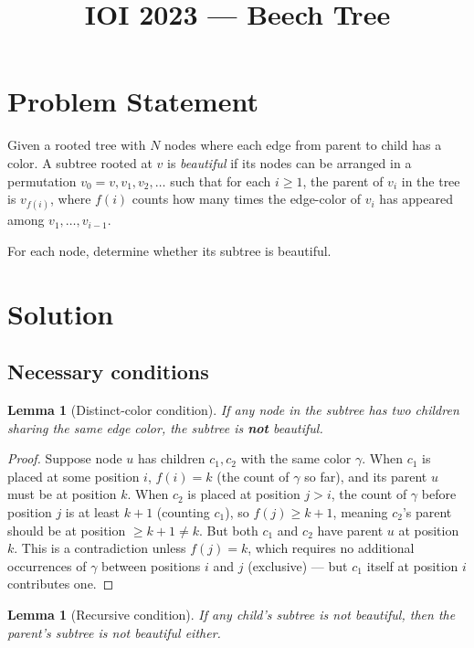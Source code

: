 \documentclass[11pt,a4paper]{article}
\title{IOI 2023 --- Beech Tree}
\author{}
\date{}
\newtheorem{lemma}[theorem]{Lemma}
\begin{document}
\maketitle

\section{Problem Statement}

Given a rooted tree with $N$ nodes where each edge from parent to child
has a color.  A subtree rooted at $v$ is \emph{beautiful} if its nodes
can be arranged in a permutation $v_0 = v, v_1, v_2, \ldots$ such that
for each $i \ge 1$, the parent of $v_i$ in the tree is $v_{f(i)}$,
where $f(i)$ counts how many times the edge-color of $v_i$ has appeared
among $v_1, \ldots, v_{i-1}$.

For each node, determine whether its subtree is beautiful.

\section{Solution}

\subsection{Necessary conditions}

\begin{lemma}[Distinct-color condition]\label{lem:distinct}
If any node in the subtree has two children sharing the same edge color,
the subtree is \textbf{not} beautiful.
\end{lemma}

\begin{proof}
Suppose node $u$ has children $c_1, c_2$ with the same color $\gamma$.
When $c_1$ is placed at some position $i$, $f(i) = k$ (the count of
$\gamma$ so far), and its parent $u$ must be at position $k$.  When
$c_2$ is placed at position $j > i$, the count of $\gamma$ before
position $j$ is at least $k + 1$ (counting $c_1$), so $f(j) \ge k + 1$,
meaning $c_2$'s parent should be at position $\ge k + 1 \ne k$.
But both $c_1$ and $c_2$ have parent $u$ at position $k$.  This is a
contradiction unless $f(j) = k$, which requires no additional
occurrences of $\gamma$ between positions $i$ and $j$ (exclusive) ---
but $c_1$ itself at position $i$ contributes one.
\end{proof}

\begin{lemma}[Recursive condition]\label{lem:recursive}
If any child's subtree is not beautiful, then the parent's subtree is
not beautiful either.
\end{lemma}
\end{document}
